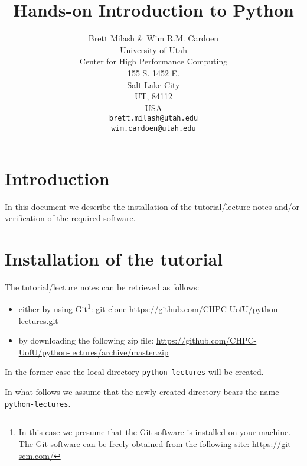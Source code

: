 \documentclass[11pt]{article}
\begin{document}
\title{Hands-on Introduction to Python}
\author{Brett Milash \& Wim R.M. Cardoen\\
        University of Utah\\
        Center for High Performance Computing\\
        155 S. 1452 E.\\
        Salt Lake City\\
        UT, 84112\\
        USA\\
        \texttt{brett.milash@utah.edu}\\
        \texttt{wim.cardoen@utah.edu}}
\renewcommand{\today}{Oct. 15, 2018}
\renewcommand{\labelitemii}{$\star$}
\maketitle

\section*{Introduction}
In this document we describe the installation of the tutorial/lecture 
notes and/or verification of the required software.

\renewcommand \thesection{\Roman{section}}

\section{Installation of the tutorial}\label{section:tutorial}
The tutorial/lecture notes can be retrieved as follows:
\begin{itemize}
\item either by using Git\footnote{In this case we presume that the Git software is installed on your machine. The Git software can be freely obtained from the following site: \href{https://git-scm.com/}{https://git-scm.com/}}:\newline
      \href{git clone https://github.com/CHPC-UofU/python-lectures.git}{git clone https://github.com/CHPC-UofU/python-lectures.git}
\item by downloading the following zip file:\newline
   \href{https://github.com/CHPC-UofU/python-lectures/archive/master.zip}{https://github.com/CHPC-UofU/python-lectures/archive/master.zip}
\end{itemize}
In the former case the local directory \texttt{python-lectures} 
will be created. 

In what follows we assume that the newly created directory bears the name \texttt{python-lectures}.  
\end{document}
